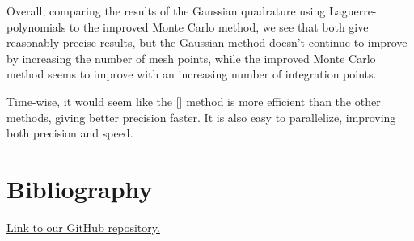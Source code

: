 \documentclass{article}
\begin{document}
	Overall, comparing the results of the Gaussian quadrature using Laguerre-polynomials to the improved Monte Carlo method, we see that both give reasonably precise results, but the Gaussian method doesn't continue to improve by increasing the number of mesh points, while the improved Monte Carlo method seems to improve with an increasing number of integration points.
	
	Time-wise, it would seem like the [] method is more efficient than the other methods, giving better precision faster. It is also easy to parallelize, improving both precision and speed.

\section*{Bibliography}
	\href{https://github.com/emmernme/MENA-Compfys/tree/master/Project3}{Link to our GitHub repository.}
\end{document}
